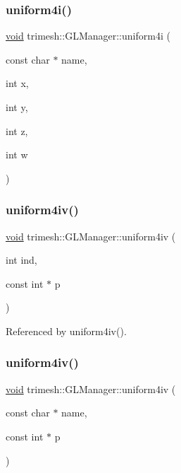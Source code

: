 \subsubsection{\texorpdfstring{uniform4i()}{uniform4i()}\hspace{0.1cm}{\footnotesize\ttfamily [2/2]}}
{\footnotesize\ttfamily \hyperlink{namespacetrimesh_a784ddfd979e1c579bda795a8edfc3f43}{void} trimesh\+::\+G\+L\+Manager\+::uniform4i (\begin{DoxyParamCaption}\item[{const char $\ast$}]{name,  }\item[{int}]{x,  }\item[{int}]{y,  }\item[{int}]{z,  }\item[{int}]{w }\end{DoxyParamCaption})\hspace{0.3cm}{\ttfamily [inline]}}

\mbox{\label{classtrimesh_1_1GLManager_a355205f6a14423af3a4f61051de7acdc}} 
\subsubsection{\texorpdfstring{uniform4iv()}{uniform4iv()}\hspace{0.1cm}{\footnotesize\ttfamily [1/2]}}
{\footnotesize\ttfamily \hyperlink{namespacetrimesh_a784ddfd979e1c579bda795a8edfc3f43}{void} trimesh\+::\+G\+L\+Manager\+::uniform4iv (\begin{DoxyParamCaption}\item[{int}]{ind,  }\item[{const int $\ast$}]{p }\end{DoxyParamCaption})\hspace{0.3cm}{\ttfamily [inline]}}



Referenced by uniform4iv().

\mbox{\label{classtrimesh_1_1GLManager_afe88dfe56ad5e78815f72e32be7a0932}} 
\subsubsection{\texorpdfstring{uniform4iv()}{uniform4iv()}\hspace{0.1cm}{\footnotesize\ttfamily [2/2]}}
{\footnotesize\ttfamily \hyperlink{namespacetrimesh_a784ddfd979e1c579bda795a8edfc3f43}{void} trimesh\+::\+G\+L\+Manager\+::uniform4iv (\begin{DoxyParamCaption}\item[{const char $\ast$}]{name,  }\item[{const int $\ast$}]{p }\end{DoxyParamCaption})\hspace{0.3cm}{\ttfamily [inline]}}

